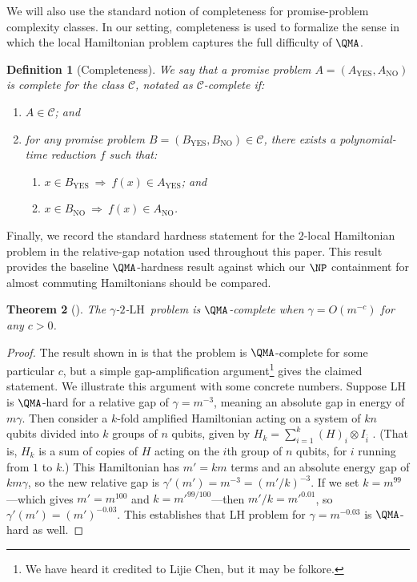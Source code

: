 \documentclass[11pt]{article}
\theoremstyle{plain}
\newtheorem{theorem}{Theorem}[section]
\newtheorem{definition}[theorem]{Definition}
\newcommand{\kLH}{$\gamma$-$2$-$\mathrm{LH}$}
\begin{document}
We will also use the standard notion of completeness for promise-problem complexity classes.  In our setting, completeness is used to formalize the sense in which the local Hamiltonian problem captures the full difficulty of $\QMA$.

\begin{definition}[Completeness]
    We say that a promise problem $A = \left(A_{\mathrm{YES}}, A_{\mathrm{NO}}\right)$ is complete for the class $\mathcal{C}$, notated as $\mathcal{C}$-complete if:
    \begin{enumerate}
        \item $A \in \mathcal{C}$; and
        \item for any promise problem $B = \left(B_{\mathrm{YES}}, B_{\mathrm{NO}}\right) \in \mathcal{C}$, there exists a polynomial-time reduction $f$ such that:
        \begin{enumerate}
            \item $x \in B_{\mathrm{YES}} \: \Longrightarrow \: f(x) \in A_{\mathrm{YES}}$; and
            \item $x \in B_{\mathrm{NO}} \: \Longrightarrow \: f(x) \in A_{\mathrm{NO}}$.
        \end{enumerate}
    \end{enumerate}
\end{definition}

Finally, we record the standard hardness statement for the $2$-local Hamiltonian problem in the relative-gap notation used throughout this paper.  This result provides the baseline $\QMA$-hardness result against which our $\NP$ containment for almost commuting Hamiltonians should be compared.

\begin{theorem}[\cite{kkr}]
    The \kLH\ problem is $\QMA$-complete when $\gamma = O(m^{-c})$ for any $c > 0$.
\end{theorem}
\begin{proof} The result shown in \cite{kkr} is that the problem is $\QMA$-complete for some particular $c$, but a simple gap-amplification argument\footnote{We have heard it credited to Lijie Chen, but it may be folkore.} gives the claimed statement. We illustrate this argument with some concrete numbers. Suppose LH is $\QMA$-hard for a relative gap of $\gamma = m^{-3} $, meaning an absolute gap in energy of $m \gamma$. Then consider a $k$-fold amplified Hamiltonian acting on a system of $kn$ qubits divided into $k$ groups of $n$ qubits, given by $H_k = \sum_{i=1}^{k} (H)_i \otimes I_{\bar{i}}$ . (That is, $H_k$ is a sum of copies of $H$ acting on the $i$th group of $n$ qubits, for $i$ running from $1$ to $k$.) This Hamiltonian has $m' = km$ terms and an absolute energy gap of $km\gamma$, so the new relative gap is $\gamma'(m') = m^{-3} = (m'/k)^{-3}$. If we set $k = m^{99}$---which gives $m' = m^{100}$ and $k = m'^{99/100}$---then $m'/k = m'^{0.01}$, so $\gamma'(m') =(m')^{-0.03}$. This establishes that LH problem for $\gamma = m^{-0.03}$ is $\QMA$-hard as well. 
\end{proof}
\end{document}
